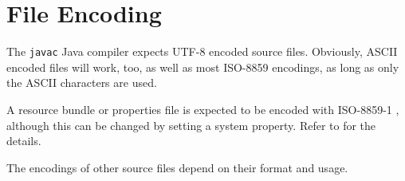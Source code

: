 \section{File Encoding}
The \verb#javac# Java compiler expects UTF-8 \autocite{UNICODE:CoreSpec,WIKIPEDIA:UTF8} encoded source files. Obviously, ASCII \autocite{WIKIPEDIA:ASCII} encoded files will work, too, as well as most ISO-8859 encodings, as long as only the ASCII characters are used.

A resource bundle or properties file \autocite{ORACLE_DOC_RESOURCEBUNDLE_CLASS} is expected to be encoded with ISO-8859-1 \autocite{WIKIPEDIA:ISO88591}, although this can be changed by setting a system property. Refer to \autocite{ORACLE_DOC_PROPERTYRESOURCEBUNDLE_CLASS} for the details. 

The encodings of other source files depend on their format and usage.

